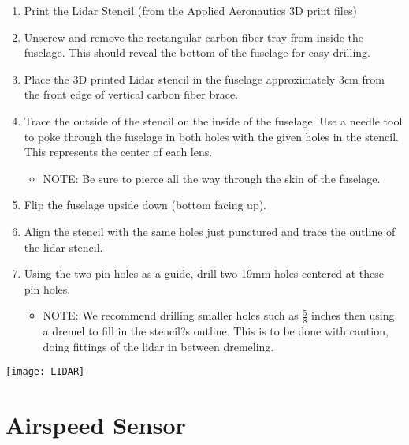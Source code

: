\documentclass{article}
\begin{document}
\begin{enumerate}
\item Print the Lidar Stencil (from the Applied Aeronautics 3D print files) 
\item Unscrew and remove the rectangular carbon fiber tray from inside the fuselage. This should reveal the bottom of the fuselage for easy drilling. 
\item Place the 3D printed Lidar stencil in the fuselage approximately 3cm from the front edge of vertical carbon fiber brace.
\item Trace the outside of the stencil on the inside of the fuselage. Use a needle tool to poke through the fuselage in both holes with the given holes in the stencil. This represents the center of each lens. 
   \begin{itemize}
   \item NOTE: Be sure to pierce all the way through the skin of the fuselage.
   \end{itemize}
\item Flip the fuselage upside down (bottom facing up).
\item Align the stencil with the same holes just punctured and trace the outline of the lidar stencil. 
\item Using the two pin holes as a guide, drill two 19mm holes centered at these pin holes.
   \begin{itemize}
   \item NOTE: We recommend drilling smaller holes such as $\frac{5}{8}$ inches then using a dremel to fill in the stencil?s outline. This is to        be done with caution, doing fittings of the lidar in between dremeling.
   \end{itemize}
\end{enumerate}

\begin{center}
\texttt{[image: LIDAR]}
\end{center}

\clearpage

\section{Airspeed Sensor}
\end{document}
